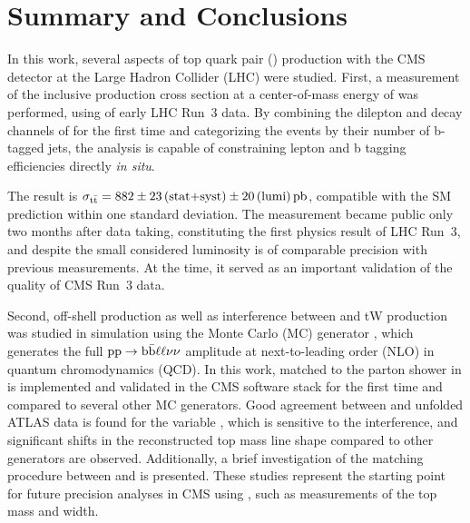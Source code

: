 \chapter{Summary and Conclusions}
\label{ch:summary}


In this work, several aspects of top quark pair (\ttbar) production with the CMS detector at the Large Hadron Collider (LHC) were studied. First, a measurement of the inclusive \ttbar production cross section at a center-of-mass energy of \sqrtsRIII was performed, using \lumiRIII of early LHC Run~3 data. By combining the dilepton and \ljets decay channels of \ttbar for the first time and categorizing the events by their number of b-tagged jets, the analysis is capable of constraining lepton and b tagging efficiencies directly \textit{in situ}. 

The result is $\sigma_{\mathrm{t \bar{t}}} = 882 \pm 23 \, \text{(stat+syst)} \pm 20 \, \text{(lumi)} \, \text{pb}$, compatible with the SM prediction within one standard deviation. The measurement became public only two months after data taking, constituting the first physics result of LHC Run~3, and despite the small considered luminosity is of comparable precision with previous \sigmatt measurements. At the time, it served as an important validation of the quality of CMS Run~3 data.


\smallskip

Second, off-shell \ttbar production as well as interference between \ttbar and tW production was studied in simulation using the Monte Carlo (MC) generator \bbfourl, which generates the full $\mathrm{pp} \rightarrow \mathrm{b \bar{b}} \ell \ell \nu \nu$ amplitude at next-to-leading order (NLO) in quantum chromodynamics (QCD). %
In this work, \bbfourl matched to the parton shower in \pythia is implemented and validated in the CMS software stack for the first time and compared to several other \ttbar MC generators. Good agreement between \bbfourl and unfolded ATLAS data is found for the variable \mblminimax, which is sensitive to the \tttW interference, and significant shifts in the reconstructed top mass line shape compared to other generators are observed. Additionally, a brief investigation of the matching procedure between \bbfourl and \pythia is presented. These studies represent the starting point for future precision \ttbar analyses in CMS using \bbfourl, such as measurements of the top mass and width.

